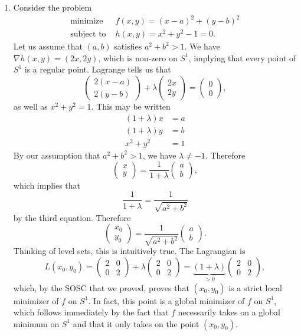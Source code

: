 \documentclass[11pt]{book}
\begin{document}
\begin{enumerate}
\item
Consider the problem
\begin{align*}
\text{minimize } &f(x,y) = (x-a)^2 + (y-b)^2 \\
\text{subject to } &h(x,y) = x^2+y^2-1=0.
\end{align*}
Let us assume that $(a,b)$ satisfies $a^2+b^2>1$. We have $\nabla h(x,y) = (2x,2y)$, which is non-zero on $S^1$, implying that every point of $S^1$ is a regular point. Lagrange tells us that
\[
\begin{pmatrix}
2(x-a) \\ 2(y-b)
\end{pmatrix} + \lambda
\begin{pmatrix}
2x \\ 2y
\end{pmatrix} = \begin{pmatrix}
0\\0
\end{pmatrix},
\]
as well as $x^2+y^2=1$. This may be written
\begin{align*}
(1+\lambda)x &= a \\
(1+\lambda)y &= b \\
x^2+y^2 &= 1
\end{align*}
By our assumption that $a^2+b^2>1$, we have $\lambda \neq -1$. Therefore
\[
\begin{pmatrix}
x \\ y
\end{pmatrix} = \frac{1}{1+\lambda}\begin{pmatrix}
a \\ b
\end{pmatrix},
\]
which implies that
\[
\frac{1}{1+\lambda} = \frac{1}{\sqrt{a^2+b^2}}
\]
by the third equation. Therefore
\[
\begin{pmatrix}
x_0 \\ y_0
\end{pmatrix} = \frac{1}{\sqrt{a^2+b^2}}\begin{pmatrix}
a \\ b
\end{pmatrix}.
\]
Thinking of level sets, this is intuitively true. The Lagrangian is
\[
L(x_0,y_0) = \begin{pmatrix}
2 & 0 \\ 0 & 2
\end{pmatrix} + \lambda \begin{pmatrix}
2 & 0 \\ 0 & 2
\end{pmatrix} = \underbrace{(1+\lambda)}_{>0}\begin{pmatrix}
2 & 0 \\ 0 & 2
\end{pmatrix},
\]
which, by the SOSC that we proved, proves that $(x_0, y_0)$ is a strict local minimizer of $f$ on $S^1$. In fact, this point is a global minimizer of $f$ on $S^1$, which follows immediately by the fact that $f$ necessarily takes on a global minimum on $S^1$ and that it only takes on the point $(x_0,y_0)$.


\end{enumerate}
\end{document}
